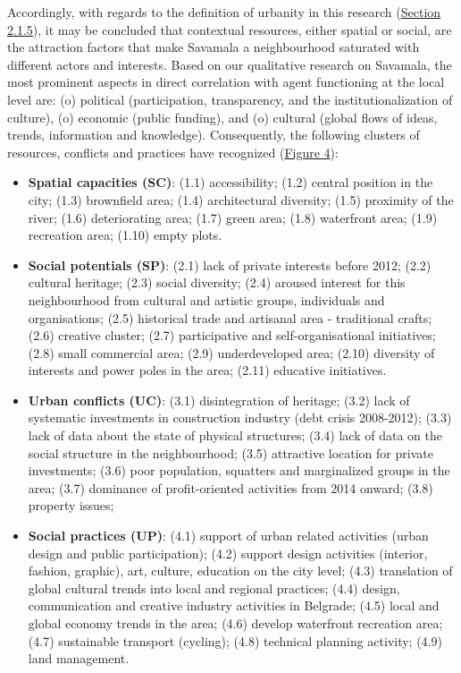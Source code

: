 \documentclass[11pt]{report}
\begin{document}
{{{{Accordingly, with regards to the definition of urbanity in this research (\href{Section 2.1.5}{Section 2.1.5}), it may be concluded that contextual resources, either spatial or social, are the attraction factors that make Savamala a neighbourhood saturated with different actors and interests.
Based on our qualitative research on Savamala, the most prominent aspects in direct correlation with agent functioning at the local level are:
(o) political (participation, transparency, and the institutionalization of culture),
(o) economic (public funding),
and
(o) cultural (global flows of ideas, trends, information and knowledge).
Consequently, the following clusters of resources, conflicts and practices have recognized (\href{Figure 4}{Figure 4}):

\begin{itemize}

\item \textbf{Spatial capacities (SC)}: 
(1.1) accessibility;
(1.2) central position in the city;
(1.3) brownfield area;
(1.4) architectural diversity;
(1.5) proximity of the river;
(1.6) deteriorating area;
(1.7) green area;
(1.8) waterfront area;
(1.9) recreation area;
(1.10) empty plots.

\item \textbf{Social potentials (SP)}:
(2.1) lack of private interests before 2012;
(2.2) cultural heritage;
(2.3) social diversity;
(2.4) aroused interest for this neighbourhood from cultural and artistic groups, individuals and organisations;
(2.5) historical trade and artisanal area - traditional crafts;
(2.6) creative cluster;
(2.7) participative and self-organisational initiatives;
(2.8) small commercial area;
(2.9) underdeveloped area;
(2.10) diversity of interests and power poles in the area;
(2.11) educative initiatives.

\item \textbf{Urban conflicts (UC)}:
(3.1) disintegration of heritage;
(3.2) lack of systematic investments in construction industry (debt crisis 2008-2012);
(3.3) lack of data about the state of physical structures;
(3.4) lack of data on the social structure in the neighbourhood;
(3.5) attractive location for private investments;
(3.6) poor population, squatters and marginalized groups in the area;
(3.7) dominance of profit-oriented activities from 2014 onward;
(3.8) property issues;

\item \textbf{Social practices (UP)}:
(4.1) support of urban related activities (urban design and public participation);
(4.2) support design activities (interior, fashion, graphic), art, culture, education on the city level;
(4.3) translation of global cultural trends into local and regional practices;
(4.4) design, communication and creative industry activities in Belgrade;
(4.5) local and global economy trends in the area;
(4.6) develop waterfront recreation area;
(4.7) sustainable transport (cycling);
(4.8) technical planning activity;
(4.9) land management.
\end{itemize}

}}}}
\end{document}
